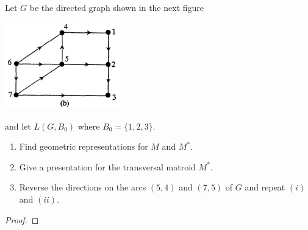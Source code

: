\prob
{
    Let $G$ be the directed graph shown in the next figure 
		    \begin{center}
                \includegraphics[width=5cm]{Test2/Problem13/Figure2_17.png}
            \end{center}\pn
		and let $L(G, B_0)$ where $B_0 = \{1,2,3\}$. 
    \begin{enumerate}[label=(\roman*)]
        \item   Find geometric representations for $M$ and $M^*$.
        \item   Give a presentation for the transversal matroid $M^*$.
        \item   Reverse the directions on the arcs $(5,4)$ and $(7,5)$ of $G$
                and repeat $(i)$ and $(ii)$.
    \end{enumerate}
}
\begin{proof}
\end{proof}